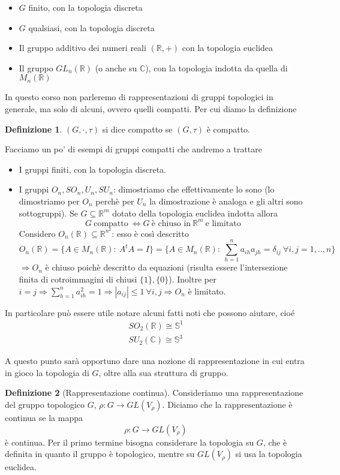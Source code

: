 \documentclass[11pt]{article}
\theoremstyle{plain}
\theoremstyle{definition}
\newtheorem{defn}{Definizione}[section]
\theoremstyle{remark}
\newcommand{\C}{\mathbb{C}}
\newcommand{\R}{\mathbb{R}}
\begin{document}
\begin{itemize}
\item $G$ finito, con la topologia discreta
\item $G$ qualsiasi, con la topologia discreta
\item Il gruppo additivo dei numeri reali $(\R, +)$ con la topologia euclidea
\item Il gruppo $GL_n (\R)$ (o anche su $\C$), con la topologia indotta da quella di $M_n(\R)$

\end{itemize}


In questo corso non parleremo di rappresentazioni di gruppi topologici in generale, ma solo di alcuni, ovvero quelli compatti. Per cui diamo la definizione

\begin{defn}
$(G, \cdot, \tau)$ si dice compatto se $(G, \tau)$ è compatto.
\end{defn}


Facciamo un po' di esempi di gruppi compatti che andremo a trattare
\begin{itemize}
\item I gruppi finiti, con la topologia discreta.
\item I gruppi $O_n, SO_n, U_n, SU_n$: dimostriamo che effettivamente lo sono (lo dimostriamo per $O_n$ perchè per $U_n$ la dimostrazione è analoga e gli altri sono sottogruppi).
Se $G\subseteq \R^m$ dotato della topologia euclidea indotta allora
\[G\ \text{compatto}\ \Leftrightarrow G\ \text{è chiuso in}\ \R^m\ \text{e limitato}\]
Considero $O_n(\R)\subseteq \R^{n^2}$: esso è così descritto
\[O_n(\R)=\{A\in M_n(\R):\ A^tA=I\}=\{A\in M_n(\R):\ \sum_{h=1}^{n}a_{ih}a_{jh}=\delta_{ij}\ \forall i,j=1,..,n\}\]
$\Rightarrow O_n$ è chiuso poichè descritto da equazioni (risulta essere l'intersezione finita di cotroimmagini di chiusi $\{1\},\{0\}$). Inoltre per $i=j\Rightarrow \sum_{h=1}^n a_{ih}^2=1\Rightarrow |a_{ij}|\leq 1\ \forall i,j\Rightarrow O_n$ è limitato.
\end{itemize}

In particolare può essere utile notare alcuni fatti noti che possono aiutare, cioé
\begin{align*}
SO_2(\R) \cong \mathbb{S}^1 \\
SU_2(\C) \cong \mathbb{S}^3
\end{align*}

A questo punto sarà opportuno dare una nozione di rappresentazione in cui entra in gioco la topologia di $G$, oltre alla sua struttura di gruppo.
\begin{defn}[Rappresentazione continua]
Consideriamo una rappresentazione del gruppo topologico $G$, $\rho: G \to GL(V_\rho)$. Diciamo che la rappresentazione è continua se la mappa
\[ \rho: G \to GL(V_\rho)\]
è continua. Per il primo termine bisogna considerare la topologia su $G$, che è definita in quanto il gruppo è topologico, mentre su $GL(V_\rho)$ si usa la topologia euclidea.
\end{defn}
\end{document}
